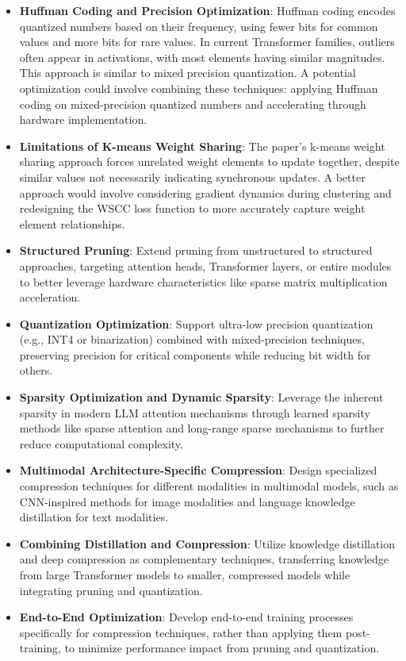 \documentclass[12pt]{article}
\begin{document}
\begin{itemize}
    \item \textbf{Huffman Coding and Precision Optimization}: Huffman coding encodes quantized numbers based on their frequency, using fewer bits for common values and more bits for rare values. In current Transformer families, outliers often appear in activations, with most elements having similar magnitudes. This approach is similar to mixed precision quantization. A potential optimization could involve combining these techniques: applying Huffman coding on mixed-precision quantized numbers and accelerating through hardware implementation.

    \item \textbf{Limitations of K-means Weight Sharing}: The paper's k-means weight sharing approach forces unrelated weight elements to update together, despite similar values not necessarily indicating synchronous updates. A better approach would involve considering gradient dynamics during clustering and redesigning the WSCC loss function to more accurately capture weight element relationships.

    \item \textbf{Structured Pruning}: Extend pruning from unstructured to structured approaches, targeting attention heads, Transformer layers, or entire modules to better leverage hardware characteristics like sparse matrix multiplication acceleration.

    \item \textbf{Quantization Optimization}: Support ultra-low precision quantization (e.g., INT4 or binarization) combined with mixed-precision techniques, preserving precision for critical components while reducing bit width for others.

    \item \textbf{Sparsity Optimization and Dynamic Sparsity}: Leverage the inherent sparsity in modern LLM attention mechanisms through learned sparsity methods like sparse attention and long-range sparse mechanisms to further reduce computational complexity.

    \item \textbf{Multimodal Architecture-Specific Compression}: Design specialized compression techniques for different modalities in multimodal models, such as CNN-inspired methods for image modalities and language knowledge distillation for text modalities.

    \item \textbf{Combining Distillation and Compression}: Utilize knowledge distillation and deep compression as complementary techniques, transferring knowledge from large Transformer models to smaller, compressed models while integrating pruning and quantization.

    \item \textbf{End-to-End Optimization}: Develop end-to-end training processes specifically for compression techniques, rather than applying them post-training, to minimize performance impact from pruning and quantization.
\end{itemize}


\printbibliography  %
\end{document}

